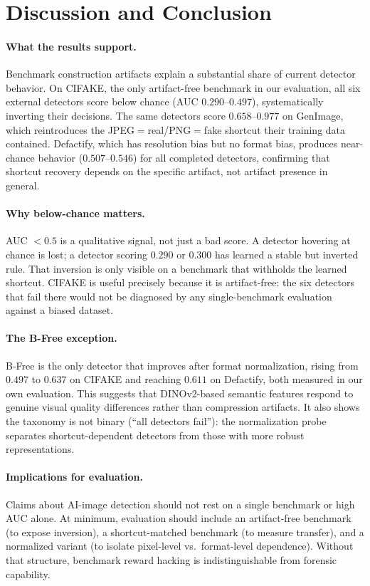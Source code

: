 \section{Discussion and Conclusion}
\label{sec:conclusion}

\paragraph{What the results support.}
Benchmark construction artifacts explain a substantial share of current detector behavior.
On CIFAKE, the only artifact-free benchmark in our evaluation, all six external detectors score below chance (AUC $0.290$--$0.497$), systematically inverting their decisions.
The same detectors score $0.658$--$0.977$ on GenImage, which reintroduces the JPEG$=$real/PNG$=$fake shortcut their training data contained.
Defactify, which has resolution bias but no format bias, produces near-chance behavior ($0.507$--$0.546$) for all completed detectors, confirming that shortcut recovery depends on the specific artifact, not artifact presence in general.

\paragraph{Why below-chance matters.}
AUC $< 0.5$ is a qualitative signal, not just a bad score.
A detector hovering at chance is lost; a detector scoring $0.290$ or $0.300$ has learned a stable but inverted rule.
That inversion is only visible on a benchmark that withholds the learned shortcut.
CIFAKE is useful precisely because it is artifact-free: the six detectors that fail there would not be diagnosed by any single-benchmark evaluation against a biased dataset.

\paragraph{The B-Free exception.}
B-Free is the only detector that improves after format normalization, rising from $0.497$ to $0.637$ on CIFAKE and reaching $0.611$ on Defactify, both measured in our own evaluation.
This suggests that DINOv2-based semantic features respond to genuine visual quality differences rather than compression artifacts.
It also shows the taxonomy is not binary (``all detectors fail''): the normalization probe separates shortcut-dependent detectors from those with more robust representations.

\paragraph{Implications for evaluation.}
Claims about AI-image detection should not rest on a single benchmark or high AUC alone.
At minimum, evaluation should include an artifact-free benchmark (to expose inversion), a shortcut-matched benchmark (to measure transfer), and a normalized variant (to isolate pixel-level vs.\ format-level dependence).
Without that structure, benchmark reward hacking is indistinguishable from forensic capability.

